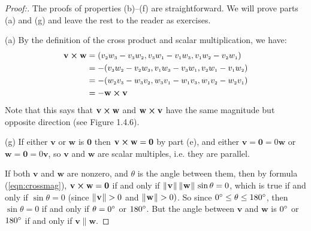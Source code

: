 \begin{proofbar}\begin{proof}[Proof:]
 The proofs of properties (b)--(f) are straightforward. We will prove parts (a) and (g) and leave the rest to the
 reader as exercises.
 \piccaption[]{}
 \par\noindent(a)
 By the definition of the cross product and scalar multiplication, we have:
 \begin{align*}
  \mathbf{v} \bm{\times} \mathbf{w} &= (v_{\scriptscriptstyle 2}w_{\scriptscriptstyle 3} - v_{\scriptscriptstyle 3}w_{\scriptscriptstyle 2},
   v_{\scriptscriptstyle 3}w_{\scriptscriptstyle 1} - v_{\scriptscriptstyle 1}w_{\scriptscriptstyle 3}, v_{\scriptscriptstyle 1}w_{\scriptscriptstyle 2} - v_{\scriptscriptstyle 2}w_{\scriptscriptstyle 1})\\
  &= -(v_{\scriptscriptstyle 3}w_{\scriptscriptstyle 2} - v_{\scriptscriptstyle 2}w_{\scriptscriptstyle 3},
   v_{\scriptscriptstyle 1}w_{\scriptscriptstyle 3} - v_{\scriptscriptstyle 3}w_{\scriptscriptstyle 1}, v_{\scriptscriptstyle 2}w_{\scriptscriptstyle 1} - v_{\scriptscriptstyle 1}w_{\scriptscriptstyle 2})\\
  &= -(w_{\scriptscriptstyle 2}v_{\scriptscriptstyle 3} - w_{\scriptscriptstyle 3}v_{\scriptscriptstyle 2},
   w_{\scriptscriptstyle 3}v_{\scriptscriptstyle 1} - w_{\scriptscriptstyle 1}v_{\scriptscriptstyle 3}, w_{\scriptscriptstyle 1}v_{\scriptscriptstyle 2} - w_{\scriptscriptstyle 2}v_{\scriptscriptstyle 1})\\
  &= -\mathbf{w} \bm{\times} \mathbf{v}
 \end{align*}
 Note that this says that $\mathbf{v} \bm{\times} \mathbf{w}$ and $\mathbf{w} \bm{\times} \mathbf{v}$ have the same
 magnitude but opposite direction (see Figure 1.4.6).
 \par\noindent(g)
 If either $\mathbf{v}$ or $\mathbf{w}$ is $\mathbf{0}$ then $\mathbf{v} \bm{\times} \mathbf{w} = \mathbf{0}$ by part (e),
 and either $\mathbf{v} = \mathbf{0} = 0\mathbf{w}$ or $\mathbf{w} = \mathbf{0} = 0\mathbf{v}$, so $\mathbf{v}$ and
 $\mathbf{w}$ are scalar multiples, i.e. they are parallel.
 
 If both $\mathbf{v}$ and $\mathbf{w}$ are nonzero, and $\theta$ is the angle between them, then by formula
 (\ref{eqn:crossmag}), $\mathbf{v} \bm{\times} \mathbf{w} = \mathbf{0}$ if and only if
 $\lVert\mspace{1mu}\mathbf{v}\mspace{1mu}\rVert\,\lVert\mspace{1mu}\mathbf{w}\mspace{1mu}\rVert\,\sin \theta = 0$, which is true if and only if $\sin \theta = 0$ (since
 $\lVert\mspace{1mu}\mathbf{v}\mspace{1mu}\rVert > 0$ and $\lVert\mspace{1mu}\mathbf{w}\mspace{1mu}\rVert > 0)$. So since $0^\circ \le \theta \le 180^\circ$, then
 $\sin \theta = 0$ if and only if $\theta = 0^\circ$ or $180^\circ$. 
 But the angle between $\mathbf{v}$ and $\mathbf{w}$
 is $0^\circ$ or $180^\circ$ if and only if $\mathbf{v} \parallel \mathbf{w}$.
\end{proof}\end{proofbar}

